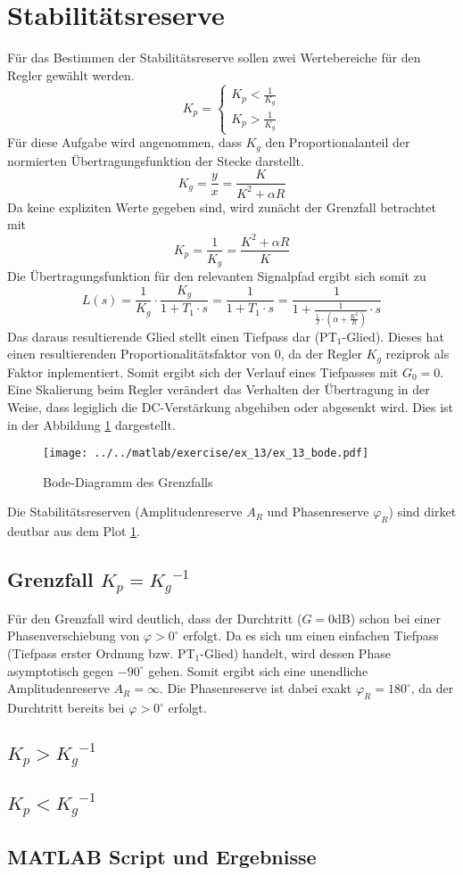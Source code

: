 \section{Stabilitätsreserve}
Für das Bestimmen der Stabilitätsreserve sollen zwei Wertebereiche für den
Regler gewählt werden.
\[
	K_p  = \left\{
		\begin{array}{l}
			K_p < \frac{1}{K_g} \\
			K_p > \frac{1}{K_g}
		\end{array}
	\right.
\]
Für diese Aufgabe wird angenommen, dass $K_g$ den Proportionalanteil
der normierten Übertragungsfunktion der Stecke darstellt.
\[
	K_g = \frac{y}{x} = \frac{K}{K^2 + \alpha R}
\]
Da keine expliziten Werte gegeben sind, wird zunächt der Grenzfall
betrachtet mit
\[
	K_p = \frac{1}{K_g} = \frac{K^2 + \alpha R}{K}
\]
Die Übertragungsfunktion für den relevanten Signalpfad ergibt sich somit zu
\[
	L(s) = \frac{1}{K_g} \cdot \frac{K_g}{1 + T_1 \cdot s}
	= \frac{1}{1 + T_1 \cdot s} 
	= \frac{1}{1 + \frac{1}{\frac{1}{J} \cdot \left(
		\alpha + \frac{K^2}{R} \right) } \cdot s }
\]
Das daraus resultierende Glied stellt einen Tiefpass dar (PT$_1$-Glied).
Dieses hat einen resultierenden Proportionalitätsfaktor von 0, da der 
Regler $K_g$ reziprok als Faktor inplementiert. Somit ergibt sich der
Verlauf eines Tiefpasses mit $G_0 = 0$. Eine Skalierung beim Regler
verändert das Verhalten der Übertragung in der Weise, dass legiglich die
DC-Verstärkung abgehiben oder abgesenkt wird. Dies ist in der Abbildung
\ref{fig:ex_13_bode} dargestellt.
\begin{figure}[h!]
	\centering
	\texttt{[image: ../../matlab/exercise/ex\_13/ex\_13\_bode.pdf]}
	\caption{Bode-Diagramm des Grenzfalls}
	\label{fig:ex_13_bode}
\end{figure}
Die Stabilitätsreserven (Amplitudenreserve $A_R$ und Phasenreserve
$\varphi_R$) sind dirket deutbar aus dem Plot \ref{fig:ex_13_bode}.

\subsection{Grenzfall $K_p = {K_g}^{-1}$}
Für den Grenzfall wird deutlich, dass der Durchtritt ($G = 0$dB) schon
bei einer Phasenverschiebung von $\varphi > 0^{\circ}$ erfolgt.
Da es sich um einen einfachen Tiefpass (Tiefpass erster Ordnung bzw.
PT$_1$-Glied) handelt, wird dessen Phase
asymptotisch gegen $-90^{\circ}$ gehen. Somit ergibt sich eine unendliche
Amplitudenreserve $A_R = \infty$. Die Phasenreserve ist dabei exakt
$\varphi_R = 180^{\circ}$, da der Durchtritt bereits bei
$\varphi > 0^{\circ}$ erfolgt.

\subsection{$K_p > {K_g}^{-1}$}

\subsection{$K_p < {K_g}^{-1}$}

\subsection{MATLAB Script und Ergebnisse}





